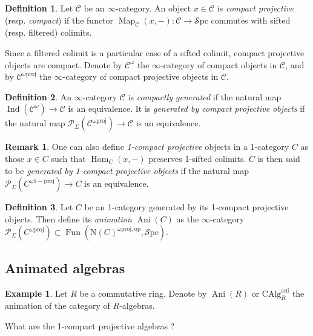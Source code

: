 \documentclass[11pt]{article}
\theoremstyle{definition}
\newtheorem{definition}{Definition}
\newtheorem{remark}{Remark}
\newtheorem{example}{Example}
\newcommand{\Ani}{\operatorname{Ani}}
\newcommand{\ani}{\mathrm{ani}}
\newcommand{\C}{\mathcal{C}}
\newcommand{\CAlg}{\mathrm{CAlg}}
\newcommand{\Fun}{\operatorname{Fun}}
\newcommand{\Hom}{\operatorname{Hom}}
\newcommand{\Ind}{\operatorname{Ind}}
\newcommand{\Map}{\operatorname{Map}}
\newcommand{\N}{\mathrm{N}}
\newcommand{\op}{\mathrm{op}}
\renewcommand{\P}{\mathcal{P}}
\newcommand{\proj}{\mathrm{proj}}
\newcommand{\Spc}{\mathcal{S}\mathrm{pc}}
\begin{document}
\begin{definition}
Let $\C$ be an $\infty$-category.
An object $x \in \C$ is \emph{compact projective} (resp. \emph{compact}) if the functor $\Map_{\C}(x, -) : \C \to \Spc$ commutes with sifted (resp. filtered) colimits.    
\end{definition}
Since a filtered colimit is a particular case of a sifted colimit, compact projective objects are compact.
Denote by $\C^{\omega}$ the $\infty$-category of compact objects in $\C$, and by $\C^{\omega\proj}$ the $\infty$-category of compact projective objects in $\C$.

\begin{definition}
    An $\infty$-category $\C$ is \emph{compactly generated} if the natural map $\Ind(\C^{\omega}) \to \C$ is an equivalence.
    It is \emph{generated by compact projective objects} if the natural map $\P_{\Sigma}(\C^{\omega\proj}) \to \C$ is an equivalence.
\end{definition}

\begin{remark}
    One can also define \emph{1-compact projective} objects in a 1-category $C$ as those $x \in C$ such that $\Hom_{C}(x, -)$ preserves 1-sifted colimits.
    $C$ is then said to be \emph{generated by 1-compact projective objects} if the natural map $\P_{\Sigma}(C^{\omega\mathrm{1-proj}}) \to C$ is an equivalence.
\end{remark}

\begin{definition}
    Let $C$ be an 1-category generated by its 1-compact projective objects.
    Then define its \emph{animation} $\Ani(C)$ as the $\infty$-category $\P_{\Sigma}(C^{\omega\proj}) \subset \Fun(\N(C)^{\omega\proj, \op}, \Spc)$.
\end{definition}

\subsection{Animated algebras}

\begin{example}
    Let $R$ be a commutative ring.
    Denote by $\Ani(R)$ or $\CAlg_R^{\ani}$ the animation of the category of $R$-algebras.
\end{example}
What are the 1-compact projective algebras ?
\end{document}
